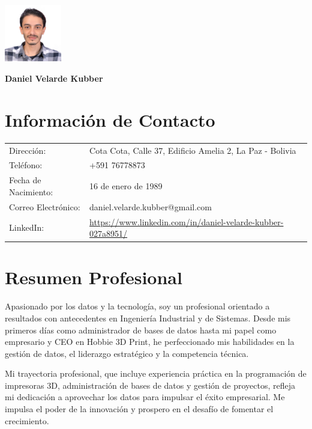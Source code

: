 \documentclass[a4paper,10pt]{article}
\begin{document}
\begin{minipage}[t]{0.7\textwidth}
\end{minipage}
\hfill
\begin{minipage}[t]{0.3\textwidth}
  \includegraphics[width=2.5cm]{photocv.jpeg}
\end{minipage}

\begin{center}
\textbf{\LARGE Daniel Velarde Kubber}
\end{center}

\section*{Información de Contacto}
\begin{tabular}{ll}
    Dirección: & Cota Cota, Calle 37, Edificio Amelia 2, La Paz - Bolivia \\
    Teléfono: & +591 76778873 \\
    Fecha de Nacimiento: & 16 de enero de 1989 \\
    Correo Electrónico: & daniel.velarde.kubber@gmail.com \\
    LinkedIn: & \url{https://www.linkedin.com/in/daniel-velarde-kubber-027a8951/} \\
\end{tabular}

\section*{Resumen Profesional}
Apasionado por los datos y la tecnología, soy un profesional orientado a resultados con antecedentes en Ingeniería Industrial y de Sistemas. Desde mis primeros días como administrador de bases de datos hasta mi papel como empresario y CEO en Hobbie 3D Print, he perfeccionado mis habilidades en la gestión de datos, el liderazgo estratégico y la competencia técnica.

Mi trayectoria profesional, que incluye experiencia práctica en la programación de impresoras 3D, administración de bases de datos y gestión de proyectos, refleja mi dedicación a aprovechar los datos para impulsar el éxito empresarial. Me impulsa el poder de la innovación y prospero en el desafío de fomentar el crecimiento.
\end{document}
